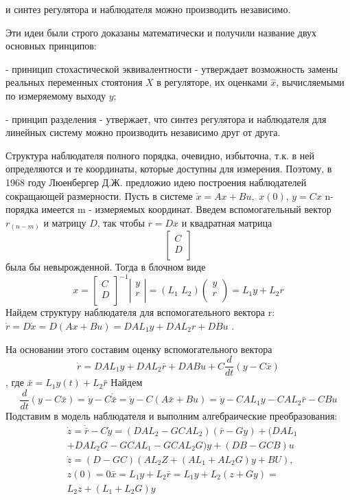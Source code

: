 \documentclass[preprint,russian,a5paper,10pt,twoside,mediummath]{ncc}
\begin{document}
и синтез регулятора и наблюдателя можно производить независимо.
\\
\par Эти идеи были строго доказаны математически и получили название двух основных принципов:
\par - приницип стохастической эквивалентности - утверждает возможность замены реальных переменных стоятония $X$ в регуляторе, их оценками  $\hat{x}$, вычисляемыми по измеряемому выходу $y$; 
\par - принцип разделения - утвержает, что синтез регулятора и наблюдателя для линейных систему можно производить независимо друг от друга. 
\par Структура наблюдателя полного порядка, очевидно, избыточна, т.к. в ней определяются и те координаты, которые доступны для измерения. Поэтому, в 1968 году Люенбергер Д.Ж. предложио идею построения наблюдателей сокращающей размерности. Пусть в системе $\dot{x}=Ax+Bu,\,\,x(0),\,y=Cx$ n-порядка имеется m - измеряемых координат. Введем вспомогательный вектор ${{r}_{(n-m)}}$ и матрицу $D$, так чтобы $r=Dx$ и квадратная матрица \[\left[ \begin{matrix}
   C  \\
   D  \\
\end{matrix} \right]\]
была бы невырожденной. Тогда в блочном виде \[x={{\left[ \begin{matrix}
   C  \\
   D  \\
\end{matrix} \right]}^{-1}}\left| \begin{matrix}
   y  \\
   r  \\
\end{matrix} \right|=\left( {{L}_{1}}\,\,{{L}_{2}} \right)\left( \begin{matrix}
   y  \\
   r  \\
\end{matrix} \right)={{L}_{1}}y+{{L}_{2}}r\]
Найдем структуру наблюдателя для вспомогательного вектора r: $\dot{r}=D\dot{x}=D(Ax+Bu)=DA{{L}_{1}}y+DA{{L}_{2}}r+DBu$ .
\par На основании этого составим оценку вспомогательного вектора \[\dot{r}=DA{{L}_{1}}y+DA{{L}_{2}}\bar{r}+DABu+C\frac{d}{dt}(y-C\bar{x})\], где $\bar{x}={{L}_{1}}y(t)+{{L}_{2}}\bar{r}$ Найдем \[\frac{d}{dt}(y-C\bar{x})=\dot{y}-C\dot{\bar{x}}=\dot{y}-C(A\bar{x}+Bu)=\dot{y}-CA{{L}_{1}}y-CA{{L}_{2}}\bar{r}-CBu\] Подставим в модель наблюдателя и выполним алгебраические преобразования: \[\begin{array}{*{35}{l}}
   {} & \dot{z}=\dot{\bar{r}}-C\dot{y}=(DA{{L}_{2}}-GCA{{L}_{2}})(\bar{r}-Gy)+(DA{{L}_{1}}  \\
   {} & +DA{{L}_{2}}G-GCA{{L}_{1}}-GCA{{L}_{2}}G)y+(DB-GCB)u  \\
   {} & \dot{z}=(D-GC)(A{{L}_{2}}Z+(A{{L}_{1}}+A{{L}_{2}}G)y+BU),  \\
   {} & z(0)=0\bar{x}={{L}_{1}}y+{{L}_{2}}\bar{r}={{L}_{1}}y+{{L}_{2}}(z+Gy)=  \\
   {} & {{L}_{2}}z+({{L}_{1}}+{{L}_{2}}G)y  \\
\end{array}\]
\end{document}
